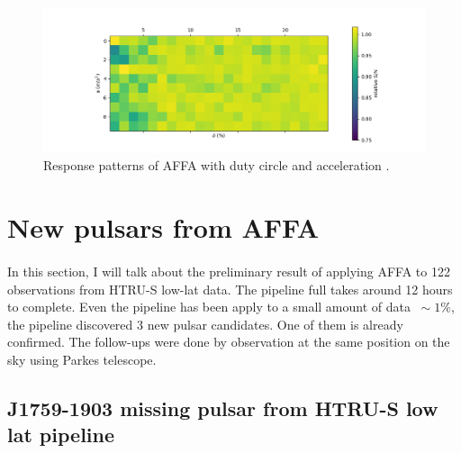 \documentclass[thesis_msc.tex]{subfiles}
\begin{document}
\begin{figure}[h!]
\centering
\includegraphics[width=1.0\textwidth]{figures/a-d.png}
\caption{Response patterns of AFFA with duty circle and acceleration .}\label{a-d}
\end{figure}

\newpage


	\section{New pulsars from AFFA}
  \paragraph{} In this section, I will talk about the preliminary result of applying AFFA to 122 observations from HTRU-S low-lat data. The pipeline full takes around 12 hours to complete. Even the pipeline has been apply to a small amount of data $~\sim 1 \%$, the pipeline discovered 3 new pulsar candidates. One of them is already confirmed. The follow-ups were done by observation at the same position on the sky using Parkes telescope. 

    \subsection{J1759-1903 missing pulsar from HTRU-S low lat pipeline }
\end{document}
